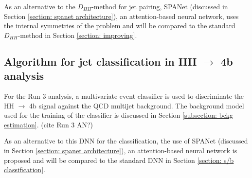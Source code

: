 As an alternative to the $D_{HH}$-method for jet pairing, SPANet (discussed in Section \ref{section: spanet architecture}), an attention-based neural network, uses the internal symmetries of the problem and will be compared to the standard $D_{HH}$-method in Section \ref{section: improving}.

\subsection{Algorithm for jet classification in HH $\to$ 4b analysis} \label{subsection: DNN}

For the Run 3 analysis, a multivariate event classifier is used to discriminate the HH $\to$ 4b signal against the QCD multijet background. The background model used for the training of the classifier is discussed in Section \ref{subsection: bckg estimation}. (cite Run 3 AN?)

As an alternative to this DNN for the classification, the use of SPANet (discussed in Section \ref{section: spanet architecture}), an attention-based neural network is proposed and will be compared to the standard DNN in Section \ref{section: s/b classification}.
